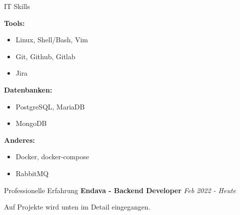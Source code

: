 \documentclass{cv}
\begin{document}
\begin{rSection}{IT Skills}
\begin{minipage}[t]{\skillWidth\linewidth}
    \medskip

    \textbf{Tools:}
    \begin{itemize}
      \item Linux, Shell/Bash, Vim
      \item Git, Github, Gitlab
      \item Jira
    \end{itemize}

    \textbf{Datenbanken:}
    \begin{itemize}
      \item PostgreSQL, MariaDB
      \item MongoDB
    \end{itemize}

    \textbf{Anderes:}
    \begin{itemize}
      \item Docker, docker-compose
      \item RabbitMQ
    \end{itemize}
  \end{minipage}
\end{rSection}

\begin{rSection}{Professionelle Erfahrung}
  \textbf{Endava - Backend Developer}
  \hfill
  {\em Feb 2022 - Heute}

  Auf Projekte wird unten im Detail eingegangen.
\end{rSection}
\end{document}
